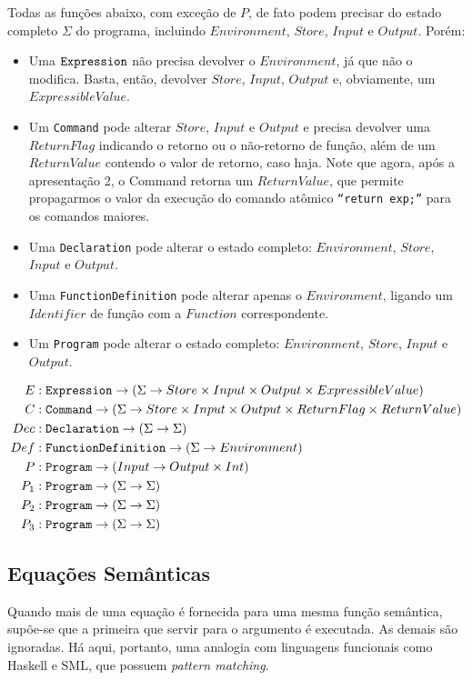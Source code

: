 \documentclass[12pt]{article}
\begin{document}
Todas as funções abaixo, com exceção de $P$, de fato podem precisar do estado completo $\Sigma$ do programa, incluindo $Environment$, $Store$, $Input$ e $Output$. Porém:
\begin{itemize}
\item Uma ${\tt Expression}$ não precisa devolver o $Environment$, já que não o modifica. Basta, então, devolver $Store$, $Input$,  $Output$ e, obviamente, um $ExpressibleValue$.
\item Um {\tt Command} pode alterar $Store$, $Input$ e $Output$ e precisa devolver uma $ReturnFlag$ indicando o retorno ou o não-retorno de função, além de um $ReturnValue$ contendo o valor de retorno, caso haja. Note que agora, após a apresentação 2, o Command retorna um $ReturnValue$, que permite propagarmos o valor da execução do comando atômico \texttt{``return exp;''} para os comandos maiores.
\item Uma {\tt Declaration} pode alterar o estado completo: $Environment$, $Store$, $Input$ e $Output$.
\item Uma {\tt FunctionDefinition} pode alterar apenas o $Environment$, ligando um $Identifier$ de função com a $Function$ correspondente.
\item Um {\tt Program} pode alterar o estado completo: $Environment$, $Store$, $Input$ e $Output$.
\end{itemize}
\begin{align*}
E   &:{\tt Expression} \rightarrow (\Sigma \rightarrow Store \times Input \times Output \times ExpressibleValue) \\
C   &:{\tt Command} \rightarrow (\Sigma \rightarrow Store \times Input \times Output\times ReturnFlag\times ReturnValue) \\
Dec &:{\tt Declaration} \rightarrow (\Sigma \rightarrow \Sigma) \\
Def &:{\tt FunctionDefinition} \rightarrow (\Sigma \rightarrow Environment) \\
P   &:{\tt Program} \rightarrow (Input \rightarrow Output\times Int) \\
P_1 &:{\tt Program} \rightarrow (\Sigma\rightarrow \Sigma) \\
P_2 &:{\tt Program} \rightarrow (\Sigma\rightarrow \Sigma) \\
P_3 &:{\tt Program} \rightarrow (\Sigma\rightarrow \Sigma) \\
\end{align*}

\subsection{Equações Semânticas}
Quando mais de uma equação é fornecida para uma mesma função semântica, supõe-se que a primeira que servir para o argumento é executada. As demais são ignoradas. Há aqui, portanto, uma analogia com linguagens funcionais como Haskell e SML, que possuem {\it pattern matching}.
\end{document}
